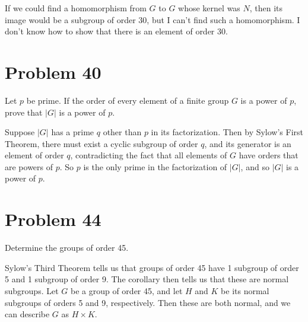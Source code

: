 \documentclass{article}
\begin{document}
If we could find a homomorphism from $G$ to $G$ whose kernel was $N$,
then its image would be a subgroup of order 30, but I can't find such
a homomorphism.  I don't know how to show that there is an element of order 30.

\section*{Problem 40}

Let $p$ be prime.  If the order of every element of a finite group $G$ is a
power of $p$, prove that $|G|$ is a power of $p$.

Suppose $|G|$ has a prime $q$ other than $p$ in its factorization.
Then by Sylow's First Theorem, there must exist a cyclic subgroup of
order $q$, and its generator is an element of order $q$, contradicting
the fact that all elements of $G$ have orders that are powers of $p$.
So $p$ is the only prime in the factorization of $|G|$, and so $|G|$
is a power of $p$.

\section*{Problem 44}

Determine the groups of order 45.

Sylow's Third Theorem tells us that groups of order 45 have 1 subgroup
of order 5 and 1 subgroup of order 9.  The corollary then tells us that
these are normal subgroups.  Let $G$ be a group of order 45, and let
$H$ and $K$ be its normal subgroups of orders 5 and 9, respectively.
Then these are both normal, and we can describe $G$ as $H\times K$.
\end{document}
